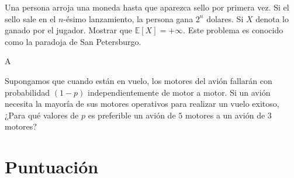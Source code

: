 \documentclass[11pt,answers,addpoints,a4paper,tittlepage=true,DIV=15,headsepline]{kommaexam}%
\theoremstyle{definition}
\begin{document}
\begin{questions}
	\question Una persona arroja una moneda hasta que aparezca sello por primera vez. Si el sello sale en el $n$-ésimo lanzamiento, la persona gana $2^{n}$ dolares. Si $X$ denota lo ganado por el jugador. Mostrar que $\mathds{E}[X]= +\infty$. Este problema es conocido como la paradoja de San Petersburgo.
	

	\begin{solutionorbox}
	A
	\end{solutionorbox}

	\question Supongamos que cuando están en vuelo, los motores del avión fallarán con probabilidad $(1-p)$ independientemente de motor a motor. Si un avión necesita la mayoría de sus motores operativos para realizar un vuelo exitoso, ¿Para qué valores de $p$ es preferible un avión de $5$ motores a un avión de $3$ motores?
\end{questions}


\vfill
\nocite{*}
\printbibliography[title={Referencias bibliográficas},heading=bibintoc]

\newpage



\section*{Puntuación}
\begin{center}
	\gradetable[h][questions]
\end{center}
\end{document}
